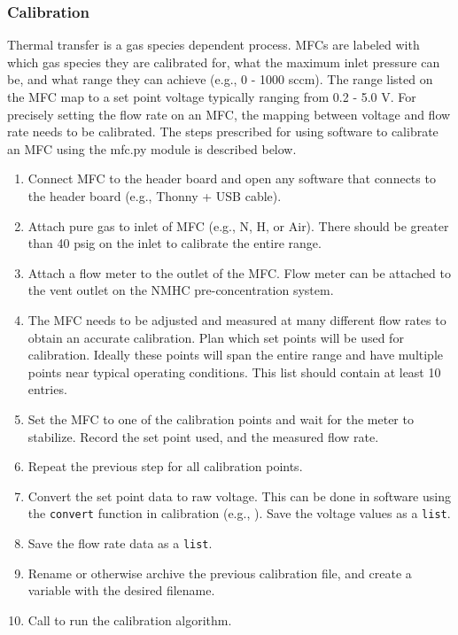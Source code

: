 \subsubsection{Calibration}
Thermal transfer is a gas species dependent process. MFCs are labeled with which gas species they are calibrated for, what the maximum inlet pressure can be, and what range they can achieve (e.g., 0 - 1000 sccm). The range listed on the MFC map to a set point voltage typically ranging from 0.2 - 5.0 V. For precisely setting the flow rate on an MFC, the mapping between voltage and flow rate needs to be calibrated. The steps prescribed for using software to calibrate an MFC using the mfc.py module is described below.

\begin{enumerate}
    \item Connect MFC to the header board and open any software that connects to the header board (e.g., Thonny + USB cable).
    \item Attach pure gas to inlet of MFC (e.g., N\2, H\2, or Air). There should be greater than 40 psig on the inlet to calibrate the entire range.
    \item Attach a flow meter to the outlet of the MFC.
    \subitem Flow meter can be attached to the vent outlet on the NMHC pre-concentration system.
    \item The MFC needs to be adjusted and measured at many different flow rates to obtain an accurate calibration. Plan which set points will be used for calibration. Ideally these points will span the entire range and have multiple points near typical operating conditions. This list should contain at least 10 entries.
    \item Set the MFC to one of the calibration points and wait for the meter to stabilize. Record the set point used, and the measured flow rate.
    \item Repeat the previous step for all calibration points.
    \item Convert the set point data to raw voltage. This can be done in software using the \texttt{convert} function in calibration (e.g., ). Save the voltage values as a \texttt{list}.
    \item Save the flow rate data as a \texttt{list}.
    \item Rename or otherwise archive the previous calibration file, and create a variable with the desired filename.
    \item Call  to run the calibration algorithm.
\end{enumerate}


